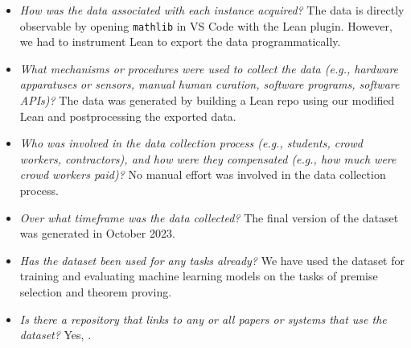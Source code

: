 
\begin{itemize}

\item \emph{How was the data associated with each instance acquired?} The data is directly observable by opening \texttt{mathlib} in VS Code with the Lean plugin. However, we had to instrument Lean to export the data programmatically.

\item \emph{What mechanisms or procedures were used to collect the data (e.g., hardware apparatuses or sensors, manual human curation, software programs, software APIs)?} The data was generated by building a Lean repo using our modified Lean and postprocessing the exported data.

\item \emph{Who was involved in the data collection process (e.g., students, crowd workers, contractors), and how were they compensated (e.g., how much were crowd workers paid)?} No manual effort was involved in the data collection process.

\item \emph{Over what timeframe was the data collected?} The final version of the dataset was generated in October 2023. 

\end{itemize}


\begin{itemize}

\item \emph{Has the dataset been used for any tasks already?} We have used the dataset for training and evaluating machine learning models on the tasks of premise selection and theorem proving.

\item \emph{Is there a repository that links to any or all papers or systems that use the dataset?} Yes, {\weburl}.

\end{itemize}


